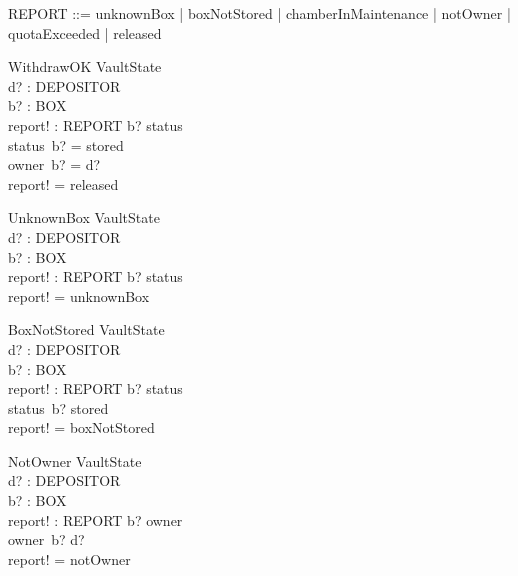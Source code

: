 \documentclass{article}
\begin{document}
\begin{zed}
REPORT ::= unknownBox | boxNotStored | chamberInMaintenance |
           notOwner | quotaExceeded | released
\end{zed}


\begin{schema}{WithdrawOK}
\Delta VaultState\\
d? : DEPOSITOR\\
b? : BOX\\
report! : REPORT
\where
b? \in \dom status\\
status~b? = stored\\
owner~b? = d?\\
report! = released
\end{schema}

\begin{schema}{UnknownBox}
\Xi VaultState\\
d? : DEPOSITOR\\
b? : BOX\\
report! : REPORT
\where
b? \notin \dom status\\
report! = unknownBox
\end{schema}

\begin{schema}{BoxNotStored}
\Xi VaultState\\
d? : DEPOSITOR\\
b? : BOX\\
report! : REPORT
\where
b? \in \dom status\\
status~b? \ne stored\\
report! = boxNotStored
\end{schema}

\begin{schema}{NotOwner}
\Xi VaultState\\
d? : DEPOSITOR\\
b? : BOX\\
report! : REPORT
\where
b? \in \dom owner\\
owner~b? \ne d?\\
report! = notOwner
\end{schema}
\end{document}
